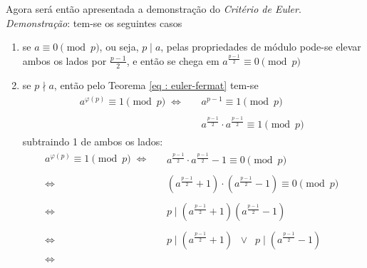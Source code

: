 Agora será então apresentada a demonstração do \textit{Critério de Euler}.
\\
\noindent
\textit{Demonstração}: tem-se os seguintes casos
\begin{enumerate}
    \item se $a \equiv 0 \pmod p$, ou seja, $p \mid a$, pelas propriedades de módulo pode-se elevar ambos os lados por $\frac{p-1}{2}$, e
    então se chega em $a^{\frac{p-1}{2}} \equiv 0 \pmod p$

    \item se $p \nmid a$, então pelo Teorema \ref{eq : euler-fermat} tem-se 
\begin{align*}
        a^{\varphi(p)} \equiv 1  \pmod p \; \Longleftrightarrow
        &\begin{aligned}
            \;\; a^{p - 1} \equiv 1  \pmod p 
        \end{aligned} \\
        &\begin{aligned}
            \;\; a^{\frac{p-1}{2}} \cdot a^{\frac{p-1}{2}} \equiv 1  \pmod p 
        \end{aligned}
\end{align*}
subtraindo 1 de ambos os lados:
\begin{align*}
        a^{\varphi(p)} \equiv 1  \pmod p \; \Longleftrightarrow
        &\begin{aligned}
            \;\; a^{\frac{p-1}{2}} \cdot a^{\frac{p-1}{2}} -1 \equiv 0  \pmod p 
        \end{aligned} \\
        \Longleftrightarrow
        &\begin{aligned}
            \;\; (a^{\frac{p-1}{2}} + 1) \cdot (a^{\frac{p-1}{2}} - 1) \equiv 0  \pmod p 
        \end{aligned} \\
        \Longleftrightarrow
        &\begin{aligned}
            \;\; p \mid (a^{\frac{p-1}{2}} + 1) (a^{\frac{p-1}{2}} - 1)
        \end{aligned} \\
        \Longleftrightarrow
        &\begin{aligned}
            \;\; p \mid (a^{\frac{p-1}{2}} + 1) \;\; \lor \;\; p \mid (a^{\frac{p-1}{2}} - 1)
        \end{aligned} \\
        \Longleftrightarrow
        &\begin{aligned}

\end{aligned}
\end{align*}
\end{enumerate}
